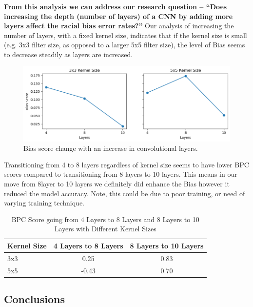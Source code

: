 \documentclass[conference]{IEEEtran}
\begin{document}
\textbf{From this analysis we can address our research question – “Does increasing the depth (number of layers) of a CNN by adding more layers affect the racial bias error rates?”}
Our analysis of increasing the number of layers, with a fixed kernel size, indicates that if the kernel size is small (e.g. 3x3 filter size, as opposed to a larger 5x5 filter size), the level of Bias seems to decrease steadily as layers are increased.

\begin{figure}[hbt!]
    \centerline{\includegraphics[width=1\linewidth]{latex/images/bias_score_change_combo.png}}
    \caption{Bias score change with an increase in convolutional layers.}
    \label{binarized_data}
\end{figure}

Transitioning from 4 to 8 layers regardless of kernel size seems to have lower BPC scores compared to transitioning from 8 layers to 10 layers. This means in our move from 8layer to 10 layers we definitely did enhance the Bias however it reduced the model accuracy. Note, this could be due to poor training, or need of varying training technique. 
\begin{table}[!t]
\renewcommand{\arraystretch}{1.3}
\caption{BPC Score going from 4 Layers to 8 Layers and 8 Layers to 10 Layers with Different Kernel Sizes}
\label{tab:bpc_scores}
\centering
\begin{tabular}{lcc}
\toprule
\textbf{Kernel Size} & \textbf{4 Layers to 8 Layers} & \textbf{8 Layers to 10 Layers} \\
\midrule
3x3 & 0.25 & 0.83 \\
5x5 & -0.43 & 0.70 \\
\bottomrule
\end{tabular}
\end{table}

\subsection{Conclusions}
\end{document}
